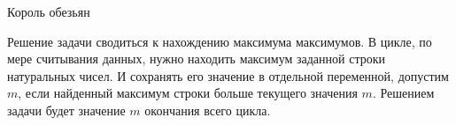 \begin{tutorial}{Король обезьян}

Решение задачи сводиться к нахождению максимума максимумов. В цикле, по мере считывания данных, нужно находить максимум заданной строки натуральных чисел. И сохранять его значение в отдельной переменной, допустим $m$, если найденный максимум строки больше текущего значения $m$. Решением задачи будет значение $m$ окончания всего цикла.

\end{tutorial}

